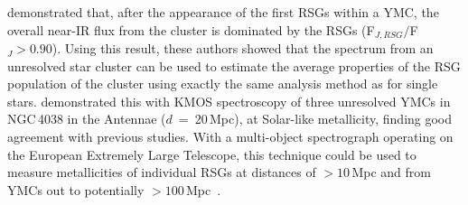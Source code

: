 



\citet{2013MNRAS.430L..35G} demonstrated that, after the appearance of the first RSGs within a YMC, the overall near-IR flux from the cluster is dominated by the RSGs (F$_{J, RSG}/$F$_{J}>0.90$).
Using this result, these authors showed that the spectrum from an unresolved star cluster can be used to estimate the average properties of the RSG population of the cluster using exactly the same analysis method as for single stars.
\citet{2015ApJ...812..160L} demonstrated this with KMOS spectroscopy of three unresolved YMCs in NGC\,4038 in the Antennae ($d$~=~20\,Mpc), at Solar-like metallicity, finding good agreement with previous studies.
With a multi-object spectrograph operating on the European Extremely Large Telescope, this technique could be used to measure metallicities of individual RSGs at distances of $>10\,$Mpc and from YMCs out to potentially $>100\,$Mpc~\citep{2011A&A...527A..50E}.

